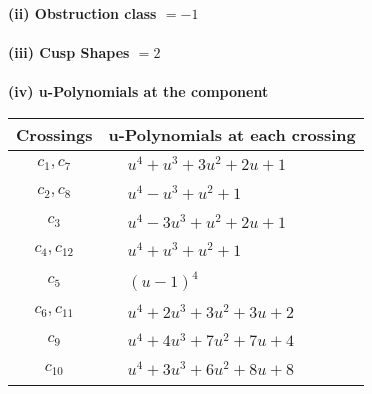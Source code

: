 \documentclass[1p]{elsarticle_modified}
\theoremstyle{definition}
\begin{document}
\flushleft \textbf{(ii) Obstruction class $= -1$}\\~\\
\flushleft \textbf{(iii) Cusp Shapes $= 2$}\\~\\
\newpage\renewcommand{\arraystretch}{1}
\flushleft \textbf{(iv) u-Polynomials at the component}\newline \\
\begin{tabular}{m{50pt}|m{274pt}}
Crossings & \hspace{64pt}u-Polynomials at each crossing \\
\hline $$\begin{aligned}c_{1},c_{7}\end{aligned}$$&$\begin{aligned}
&u^4+u^3+3 u^2+2 u+1
\end{aligned}$\\
\hline $$\begin{aligned}c_{2},c_{8}\end{aligned}$$&$\begin{aligned}
&u^4- u^3+u^2+1
\end{aligned}$\\
\hline $$\begin{aligned}c_{3}\end{aligned}$$&$\begin{aligned}
&u^4-3 u^3+u^2+2 u+1
\end{aligned}$\\
\hline $$\begin{aligned}c_{4},c_{12}\end{aligned}$$&$\begin{aligned}
&u^4+u^3+u^2+1
\end{aligned}$\\
\hline $$\begin{aligned}c_{5}\end{aligned}$$&$\begin{aligned}
&(u-1)^4
\end{aligned}$\\
\hline $$\begin{aligned}c_{6},c_{11}\end{aligned}$$&$\begin{aligned}
&u^4+2 u^3+3 u^2+3 u+2
\end{aligned}$\\
\hline $$\begin{aligned}c_{9}\end{aligned}$$&$\begin{aligned}
&u^4+4 u^3+7 u^2+7 u+4
\end{aligned}$\\
\hline $$\begin{aligned}c_{10}\end{aligned}$$&$\begin{aligned}
&u^4+3 u^3+6 u^2+8 u+8
\end{aligned}$\\
\hline
\end{tabular}\\~\\
\end{document}
